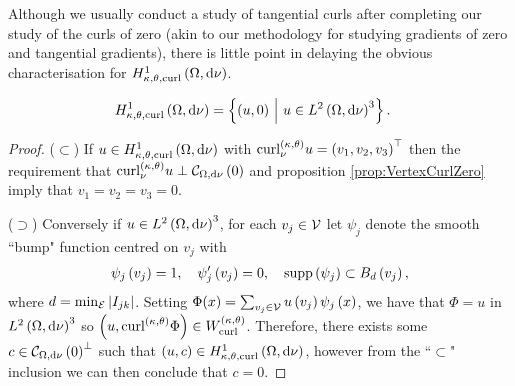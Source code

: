 Although we usually conduct a study of tangential curls after completing our study of the curls of zero (akin to our methodology for studying gradients of zero and tangential gradients), there is little point in delaying the obvious characterisation for $H^1_{\kappa,\theta,\mathrm{curl}}\left( \Omega, \mathrm{d}\nu \right)$.
\begin{cory} \label{cory:VertexCurlSob}
	\begin{align*}
		H^1_{\kappa,\theta,\mathrm{curl}}\left( \Omega, \mathrm{d}\nu \right) &= \left\{  \left( u,0 \right) \ \middle\vert \  u\in L^{2}\left( \Omega,\mathrm{d} \nu \right)^3  \right\}.
	\end{align*}
\end{cory}
\begin{proof}
	($\subset$) If $u\in H^1_{\kappa,\theta,\mathrm{curl}}\left( \Omega, \mathrm{d}\nu \right)$ with $\mathrm{curl}_{\nu}^{\left( \kappa, \theta \right)}u=\left( v_1,v_2,v_3 \right)^\top$ then the requirement that $\mathrm{curl}_{\nu}^{\left( \kappa, \theta \right)}u \perp \mathcal{C}_{ \Omega, \mathrm{d}\nu}\left( 0 \right)$ and proposition \ref{prop:VertexCurlZero} imply that $v_1=v_2=v_3=0$.
	
	($\supset$) Conversely if $u\in L^{2}\left( \Omega,\mathrm{d} \nu \right)^3$, for each $v_j\in\mathcal{V}$ let $\psi_j$ denote the smooth ``bump" function centred on $v_j$ with
	\begin{align*}
		\psi_j\left( v_j \right) = 1, \quad
		\psi_j'\left( v_j \right) = 0, \quad
		\mathrm{supp}\left( \psi_j \right) \subset B_d\left( v_j \right),
	\end{align*}
	where $d=\min_{\mathcal{E}}\left\lvert I_{jk} \right\rvert$.
	Setting $\Phi(x) = \sum_{v_j\in\mathcal{V}}u\left( v_j \right)\psi_j\left( x \right)$, we have that $\Phi=u$ in $L^{2}\left( \Omega,\mathrm{d} \nu \right)^3$ so $\left( u,\mathrm{curl}_{}^{\left( \kappa, \theta \right)}\Phi \right)\in W^{\left( \kappa, \theta \right)}_{\mathrm{curl}}$.
	Therefore, there exists some $c\in\mathcal{C}_{ \Omega, \mathrm{d}\nu}\left( 0 \right)^{\perp}$ such that $\left( u,c \right)\in H^1_{\kappa,\theta,\mathrm{curl}}\left( \Omega, \mathrm{d}\nu \right)$, however from the ``$\subset$" inclusion we can then conclude that $c = 0$.
\end{proof}

